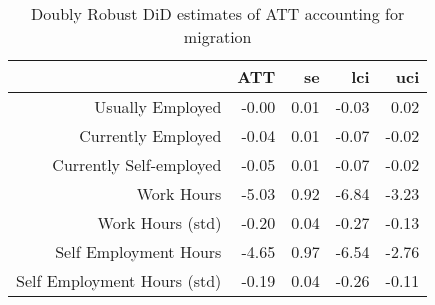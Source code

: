 \begin{table}[ht]
\centering
\begin{tabular}{rrrrr}
  \toprule
 & ATT & se & lci & uci \\ 
  \midrule
Usually Employed & -0.00 & 0.01 & -0.03 & 0.02 \\ 
  Currently Employed & -0.04 & 0.01 & -0.07 & -0.02 \\ 
  Currently Self-employed & -0.05 & 0.01 & -0.07 & -0.02 \\ 
  Work Hours & -5.03 & 0.92 & -6.84 & -3.23 \\ 
  Work Hours (std) & -0.20 & 0.04 & -0.27 & -0.13 \\ 
  Self Employment Hours & -4.65 & 0.97 & -6.54 & -2.76 \\ 
  Self Employment Hours (std) & -0.19 & 0.04 & -0.26 & -0.11 \\ 
   \bottomrule
\end{tabular}
\caption{Doubly Robust DiD estimates
             of ATT accounting for migration} 
\end{table}
